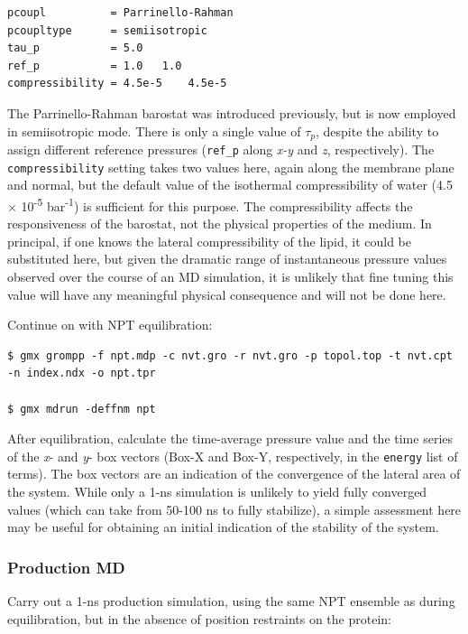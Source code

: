 \documentclass[9pt,tutorial,pubversion]{livecoms}
\begin{document}
\begin{lstlisting}
pcoupl          = Parrinello-Rahman
pcoupltype      = semiisotropic
tau_p           = 5.0
ref_p           = 1.0   1.0
compressibility = 4.5e-5    4.5e-5
\end{lstlisting}
%
The Parrinello-Rahman barostat was introduced previously, but is now employed in semiisotropic mode. There is only a single value of $\tau_p$, despite the ability to assign different reference pressures (\texttt{ref\_p} along {\em x-y} and {\em z}, respectively). The \texttt{compressibility} setting takes two values here, again along the membrane plane and normal, but the default value of the isothermal compressibility of water (4.5 $\times$ 10\textsuperscript{-5} bar\textsuperscript{-1}) is sufficient for this purpose. The compressibility affects the responsiveness of the barostat, not the physical properties of the medium. In principal, if one knows the lateral compressibility of the lipid, it could be substituted here, but given the dramatic range of instantaneous pressure values observed over the course of an MD simulation, it is unlikely that fine tuning this value will have any meaningful physical consequence and will not be done here.

Continue on with NPT equilibration:

\begin{lstlisting}
$ gmx grompp -f npt.mdp -c nvt.gro -r nvt.gro -p topol.top -t nvt.cpt -n index.ndx -o npt.tpr

$ gmx mdrun -deffnm npt
\end{lstlisting}

After equilibration, calculate the time-average pressure value and the time series of the {\em x}- and {\em y}- box vectors (Box-X and Box-Y, respectively, in the \texttt{energy} list of terms). The box vectors are an indication of the convergence of the lateral area of the system. While only a 1-ns simulation is unlikely to yield fully converged values (which can take from 50-100 ns to fully stabilize), a simple assessment here may be useful for obtaining an initial indication of the stability of the system.

\subsubsection{Production MD} \label{kalp_md}

Carry out a 1-ns production simulation, using the same NPT ensemble as during equilibration, but in the absence of position restraints on the protein:
\end{document}
